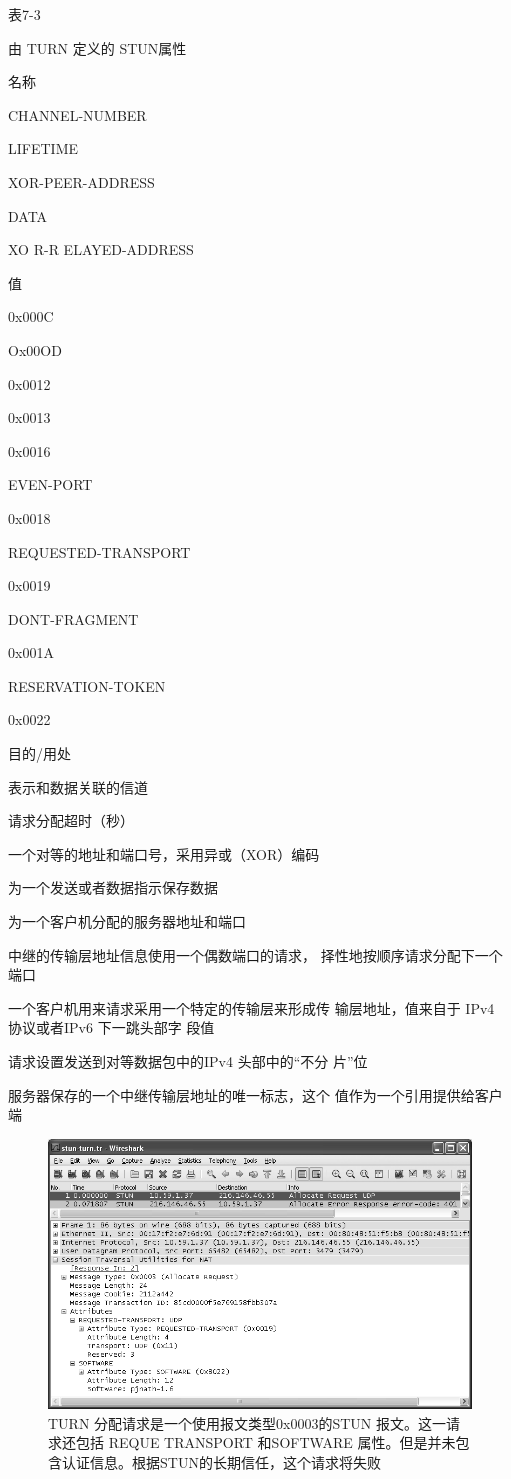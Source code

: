 表7-3

由 TURN 定义的 STUN属性

名称

CHANNEL-NUMBER

LIFETIME

XOR-PEER-ADDRESS

DATA

XO R-R ELAYED-ADDRESS

值

0x000C

Ox00OD

0x0012

0x0013

0x0016

EVEN-PORT

0x0018

REQUESTED-TRANSPORT

0x0019

DONT-FRAGMENT

0x001A

RESERVATION-TOKEN

0x0022

目的/用处

表示和数据关联的信道

请求分配超时（秒）

一个对等的地址和端口号，采用异或（XOR）编码

为一个发送或者数据指示保存数据

为一个客户机分配的服务器地址和端口

中继的传输层地址信息使用一个偶数端口的请求，
择性地按顺序请求分配下一个端口

一个客户机用来请求采用一个特定的传输层来形成传
输层地址，值来自于 IPv4 协议或者IPv6 下一跳头部字
段值

请求设置发送到对等数据包中的IPv4 头部中的“不分
片”位

服务器保存的一个中继传输层地址的唯一标志，这个
值作为一个引用提供给客户端

\begin{figure}[H]
  \centering
  \includegraphics[scale=0.5]{imgs/7/7-12.png}
  \caption{TURN 分配请求是一个使用报文类型0x0003的STUN 报文。这一请求还包括 REQUE TRANSPORT
  和SOFTWARE 属性。但是并未包含认证信息。根据STUN的长期信任，这个请求将失败}
\end{figure}

